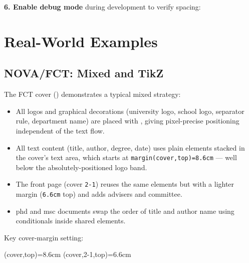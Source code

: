 \medskip
\noindent\textbf{6.  Enable debug mode} during development to verify spacing:
\begin{latexcode}
\end{latexcode}


\section{Real-World Examples}
\label{sec:covers_examples}

\subsection{NOVA/FCT: Mixed  and TikZ}
\label{sec:covers_nova_fct}

The \gls{FCT} cover ()
demonstrates a typical mixed strategy:

\begin{itemize}
  \item All logos and graphical decorations (university logo, school logo,
        separator rule, department name) are placed with
        , giving pixel-precise positioning
        independent of the text flow.
  \item All text content (title, author, degree, date) uses plain
        \latexinline{\ntaddtocover} elements stacked in the cover's text area, which
        starts at \texttt{margin(cover,top)=8.6cm} — well below the
        absolutely-positioned logo band.
  \item The front page (cover \texttt{2-1}) reuses the same elements but with
        a lighter margin (\texttt{6.6cm} top) and adds advisers and committee.
  \item \gls{phd} and \gls{msc} documents swap the order of title and author name using
        \latexinline{\ifphddoc} conditionals inside shared elements.
\end{itemize}

Key cover-margin setting:
\begin{latexcode}
\SetMargin*(cover,top)={8.6cm}   %
\SetMargin*(cover,2-1,top)={6.6cm} %
\end{latexcode}

